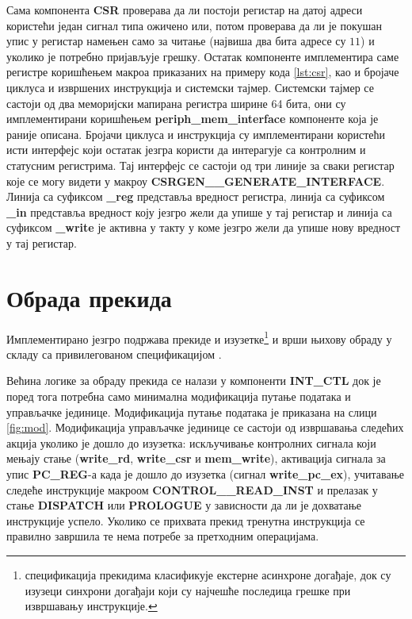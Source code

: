 Сама компонента \textbf{CSR} проверава да ли постоји регистар на датој адреси користећи један сигнал типа ожичено или, потом проверава да ли је покушан упис у регистар намењен само за читање (највиша два бита адресе су $11$) и уколико је потребно пријављује грешку. Остатак компоненте имплементира саме регистре коришћењем макроа приказаних на примеру кода \ref{lst:csr}, као и бројаче циклуса и извршених инструкција и системски тајмер. Системски тајмер се састоји од два меморијски мапирана регистра ширине 64 бита, они су имплементирани коришћењем \textbf{periph\_mem\_interface} компоненте која је раније описана. Бројачи циклуса и инструкција су имплементирани користећи исти интерфејс који остатак језгра користи да интерагује са контролним и статусним регистрима. Тај интерфејс се састоји од три линије за сваки регистар које се могу видети у макроу \textbf{CSRGEN\_\_GENERATE\_INTERFACE}. Линија са суфиксом \textbf{\_reg} представља вредност регистра, линија са суфиксом \textbf{\_in} представља вредност коју језгро жели да упише у тај регистар и линија са суфиксом \textbf{\_write} је активна у такту у коме језгро жели да упише нову вредност у тај регистар.



\section{Обрада прекида}

Имплементирано језгро подржава прекиде и изузетке\footnote{ спецификација прекидима класификује екстерне асинхроне догађаје, док су изузеци синхрони догађаји који су најчешће последица грешке при извршавању инструкције.} и врши њихову обраду у складу са привилегованом спецификацијом \cite{priv_spec}.

Већина логике за обраду прекида се налази у компоненти \textbf{INT\_CTL} док је поред тога потребна само минимална модификација путање података и управљачке јединице.
Модификација путање података је приказана на слици \ref{fig:mod}. Модификација управљачке јединице се састоји од извршавања следећих акција уколико је дошло до изузетка:
искључивање контролних сигнала који мењају стање (\textbf{write\_rd}, \textbf{write\_csr} и \textbf{mem\_write}), активација сигнала за упис \textbf{PC\_REG}-а када је дошло до изузетка (сигнал \textbf{write\_pc\_ex}), учитавање следеће инструкције макроом \textbf{CONTROL\_\_READ\_INST} и прелазак у стање \textbf{DISPATCH} или \textbf{PROLOGUE} у зависности да ли је дохватање инструкције успело. Уколико се прихвата прекид тренутна инструкција се правилно завршила те нема потребе за претходним операцијама.

